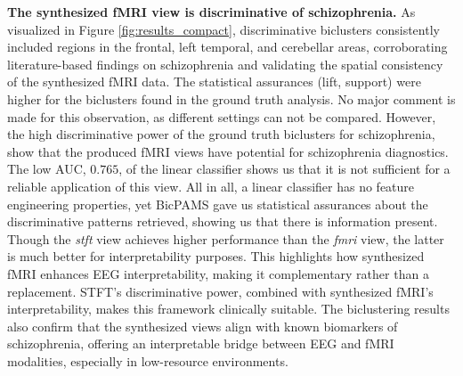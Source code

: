 \documentclass{article}
\begin{document}
\noindent\textbf{The synthesized fMRI view is discriminative of schizophrenia.} As visualized in Figure \ref{fig:results_compact}, discriminative biclusters consistently included regions in the frontal, left temporal, and cerebellar areas, corroborating literature-based findings on schizophrenia and validating the spatial consistency of the synthesized fMRI data. The statistical assurances (lift, support) were higher for the biclusters found in the ground truth analysis. No major comment is made for this observation, as different settings can not be compared. However, the high discriminative power of the ground truth biclusters for schizophrenia, show that the produced fMRI views have potential for schizophrenia diagnostics. The low AUC, $0.765$, of the linear classifier shows us that it is not sufficient for a reliable application of this view. All in all, a linear classifier has no feature engineering properties, yet BicPAMS gave us statistical assurances about the discriminative patterns retrieved, showing us that there is information present. Though the \textit{stft} view achieves higher performance than the \textit{fmri} view, the latter is much better for interpretability purposes. This highlights how synthesized fMRI enhances EEG interpretability, making it complementary rather than a replacement. STFT's discriminative power, combined with synthesized fMRI’s interpretability, makes this framework clinically suitable. The biclustering results also confirm that the synthesized views align with known biomarkers of schizophrenia, offering an interpretable bridge between EEG and fMRI modalities, especially in low-resource environments.
\end{document}
